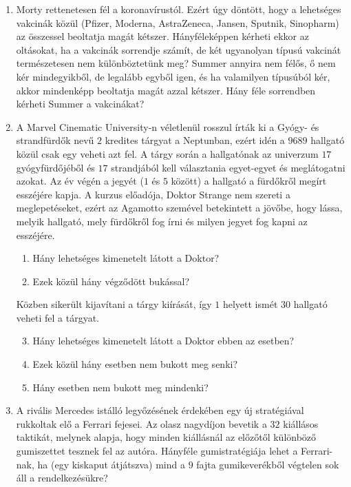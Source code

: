 \documentclass[a4paper,12pt]{article}
\begin{document}
    \noindent{}
    \begin{enumerate}
        \item Morty rettenetesen fél a koronavírustól. Ezért úgy döntött, hogy a lehetséges vakcinák közül (Pfizer, Moderna, AstraZeneca, Jansen, Sputnik, Sinopharm) az összessel beoltatja magát kétszer. Hányféleképpen kérheti ekkor az oltásokat, ha a vakcinák sorrendje számít, de két ugyanolyan típusú vakcinát természetesen nem különböztetünk meg? Summer annyira nem félős, ő nem kér mindegyikből, de legalább egyből igen, és ha valamilyen típusúból kér, akkor mindenképp beoltatja magát azzal kétszer. Hány féle sorrendben kérheti Summer a vakcinákat?
        
        \item A Marvel Cinematic University-n véletlenül rosszul írták ki a Gyógy- és strandfürdők nevű $2$ kredites tárgyat a Neptunban, ezért idén a $9689$ hallgató közül csak egy veheti azt fel. A tárgy során a hallgatónak az univerzum $17$ gyógyfürdőjéből és $17$ strandjából kell választania egyet-egyet és meglátogatni azokat. Az év végén a jegyét ($1$ és $5$ között) a hallgató a fürdőkről megírt esszéjére kapja. A kurzus előadója, Doktor Strange nem szereti a meglepetéseket, ezért az Agamotto szemével betekintett a jövőbe, hogy lássa, melyik hallgató, mely fürdőkről fog írni és milyen jegyet fog kapni az esszéjére.
        \begin{enumerate}
            \item Hány lehetséges kimenetelt látott a Doktor?
            \item Ezek közül hány végződött bukással?
        \end{enumerate}
        Közben sikerült kijavítani a tárgy kiírását, így $1$ helyett ismét $30$ hallgató veheti fel a tárgyat.
        \begin{enumerate}
            \setcounter{enumii}{2}
            \item Hány lehetséges kimenetelt látott a Doktor ebben az esetben?
            \item Ezek közül hány esetben nem bukott meg senki?
            \item Hány esetben nem bukott meg mindenki?
        \end{enumerate}

        \item A rivális Mercedes istálló legyőzésének érdekében egy új stratégiával rukkoltak elő a Ferrari fejesei. Az olasz nagydíjon bevetik a $32$ kiállásos taktikát, melynek alapja, hogy minden kiállásnál az előzőtől különböző gumiszettet tesznek fel az autóra. Hányféle gumistratégiája lehet a Ferrari-nak, ha (egy kiskaput átjátszva) mind a $9$ fajta gumikeverékből végtelen sok áll a rendelkezésükre?
        

\end{enumerate}
\end{document}
